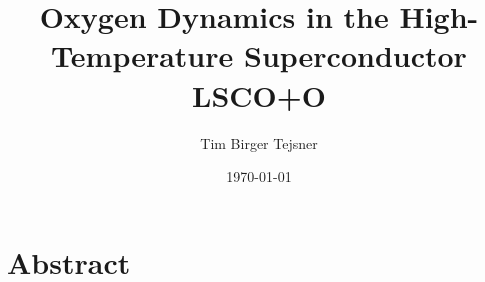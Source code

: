 \documentclass[a4paper, oneside, table]{memoir}
\author{Tim Birger Tejsner}
\title{Oxygen Dynamics in the High-Temperature Superconductor LSCO+O}
\date{\today}
\begin{document}


\clearpage

\chapter*{Abstract}

\clearpage

\tableofcontents

\clearpage

\listoftodos


%








%


\appendix



\printbibliography
\end{document}
